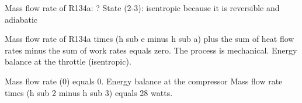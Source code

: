 Mass flow rate of R134a: ?  
State (2-3): isentropic because it is reversible and adiabatic  

Mass flow rate of R134a times (h sub e minus h sub a) plus the sum of heat flow rates minus the sum of work rates equals zero.  
The process is mechanical.  
Energy balance at the throttle (isentropic).  

Mass flow rate (0) equals 0.  
Energy balance at the compressor  
Mass flow rate times (h sub 2 minus h sub 3) equals 28 watts.